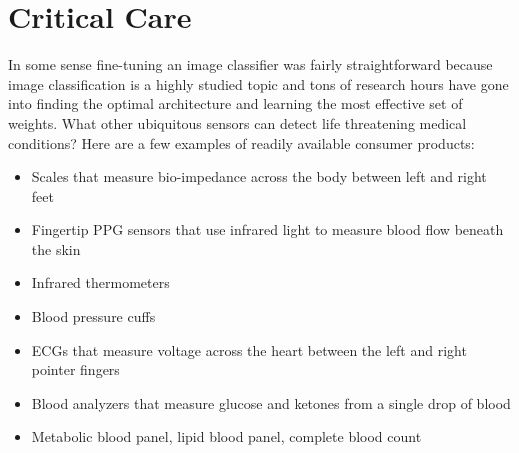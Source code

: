 
\section{Critical Care}

In some sense fine-tuning an image classifier was fairly straightforward because image classification is a highly studied topic and tons of research hours have gone into finding the optimal architecture and learning the most effective set of weights.  What other ubiquitous sensors can detect life threatening medical conditions? Here are a few examples of readily available consumer products:

\begin{itemize}
    \item Scales that measure bio-impedance across the body between left and right feet
    \item Fingertip PPG sensors that use infrared light to measure blood flow beneath the skin
    \item Infrared thermometers
    \item Blood pressure cuffs
    \item ECGs that measure voltage across the heart between the left and right pointer fingers
    \item Blood analyzers that measure glucose and ketones from a single drop of blood
    \item Metabolic blood panel, lipid blood panel, complete blood count
\end{itemize}

